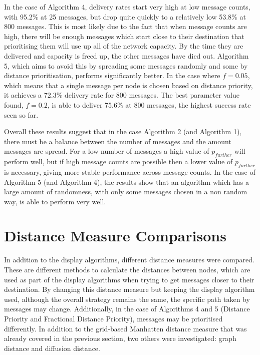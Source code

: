 \documentclass[bsc,frontabs,twoside,singlespacing,parskip,deptreport]{infthesis}     %
\begin{document}
In the case of Algorithm 4, delivery rates start very high at low message counts, with 95.2\% at 25 messages, but drop quite quickly to a relatively low 53.8\% at 800 messages. This is most likely due to the fact that when message counts are high, there will be enough messages which start close to their destination that prioritising them will use up all of the network capacity. By the time they are delivered and capacity is freed up, the other messages have died out. Algorithm 5, which aims to avoid this by spreading some messages randomly and some by distance prioritisation, performs significantly better. In the case where $f=0.05$, which means that a single message per node is chosen based on distance priority, it achieves a 72.3\% delivery rate for 800 messages. The best parameter value found, $f=0.2$, is able to deliver 75.6\% at 800 messages, the highest success rate seen so far.

Overall these results suggest that in the case Algorithm 2 (and Algorithm 1), there must be a balance between the number of messages and the amount messages are spread. For a low number of messages a high value of $p_{further}$ will perform well, but if high message counts are possible then a lower value of $p_{further}$ is necessary, giving more stable performance across message counts. In the case of Algorithm 5 (and Algorithm 4), the results show that an algorithm which has a large amount of randomness, with only some messages chosen in a non random way, is able to perform very well.

\section{Distance Measure Comparisons} \label{sec:distance_measure_comparisons}
In addition to the display algorithms, different distance measures were compared. These are different methods to calculate the distances between nodes, which are used as part of the display algorithms when trying to get messages closer to their destination. By changing this distance measure but keeping the display algorithm used, although the overall strategy remains the same, the specific path taken by messages may change. Additionally, in the case of Algorithms 4 and 5 (Distance Priority and Fractional Distance Priority), messages may be prioritised differently. In addition to the grid-based Manhatten distance measure that was already covered in the previous section, two others were investigated: graph distance and diffusion distance.
\end{document}
